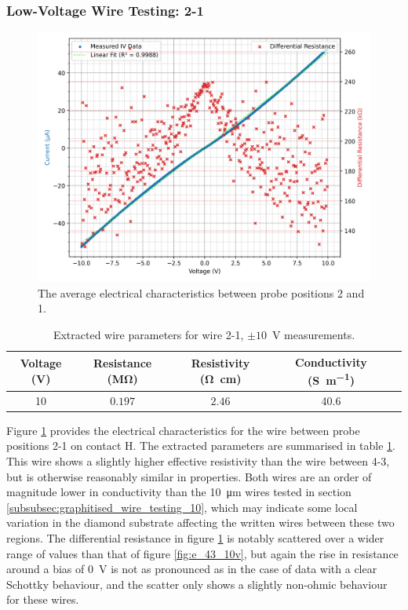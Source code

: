 \begin{refsection}
\subsubsection{Low-Voltage Wire Testing: 2-1}
\begin{figure}[H]
    \centering
    \includegraphics[width=\linewidth]{Chapter7/Figs/Raster/Emitters/21 3x 10V.png}
    \caption{The average electrical characteristics between probe positions 2 and 1.}
    \label{fig:e_21_10v}
\end{figure}

\begin{table}[h!]
\centering
\begin{tabular}{|c|c|c|c|c|}
\hline
\textbf{Voltage (V)} & \textbf{Resistance (\si{\mega\ohm})}  & \textbf{Resistivity (\si{\ohm\centi\metre})} & \textbf{Conductivity (\si{\siemens\per\metre})} \\
\hline
10 & $0.197$ & $2.46$ & 40.6 \\
\hline
\end{tabular}
\caption{Extracted wire parameters for wire 2-1, $\pm10$~\si{\volt} measurements.}
\label{tab:21_e_wire_parameters_10v}
\end{table}

Figure \ref{fig:e_21_10v} provides the electrical characteristics for the wire between probe positions 2-1 on contact H. The extracted parameters are summarised in table \ref{tab:21_e_wire_parameters_10v}. This wire shows a slightly higher effective resistivity than the wire between 4-3, but is otherwise reasonably similar in properties. Both wires are an order of magnitude lower in conductivity than the 10~\si{\micro\metre} wires tested in section \ref{subsubsec:graphitised_wire_testing_10}, which may indicate some local variation in the diamond substrate affecting the written wires between these two regions. The differential resistance in figure \ref{fig:e_21_10v} is notably scattered over a wider range of values than that of figure \ref{fig:e_43_10v}, but again the rise in resistance around a bias of 0~\si{\volt} is not as pronounced as in the case of data with a clear Schottky behaviour, and the scatter only shows a slightly non-ohmic behaviour for these wires.


\end{refsection}
